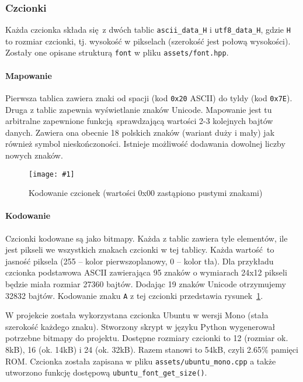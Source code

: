 \documentclass[polish]{aghengthesis}
\newcommand{\imgint}[4]{
	\begin{figure}[{#4}]
		\centering
		\texttt{[image: \#1]}
		\caption{#2}
		\label{#1}
	\end{figure}
}
\newcommand{\imgh}[3]{\imgint{#1}{#2}{#3}{H}}
\begin{document}
			\subsubsection{Czcionki}
				Każda czcionka składa się z dwóch tablic \lstinline|ascii_data_H| i \lstinline|utf8_data_H|, gdzie \lstinline|H| to rozmiar czcionki, tj. wysokość w pikselach (szerokość jest połową wysokości). Zostały one opisane strukturą \lstinline|font| w pliku \lstinline|assets/font.hpp|.
				
				\paragraph{Mapowanie}
					Pierwsza tablica zawiera znaki od spacji (kod \lstinline|0x20| ASCII) do tyldy (kod \lstinline|0x7E|). Druga z tablic zapewnia wyświetlanie znaków Unicode. Mapowanie jest tu arbitralne zapewnione funkcją sprawdzającą wartości 2-3 kolejnych bajtów danych. Zawiera ona obecnie 18 polskich znaków (wariant duży i mały) jak również symbol nieskończoności. Istnieje możliwość dodawania dowolnej liczby nowych znaków.
				
				\imgh{3/PicoRadio-screen-font}{Kodowanie czcionek (wartości 0x00 zastąpiono pustymi znakami)}{0.6}
				\paragraph{Kodowanie}
					Czcionki kodowane są jako bitmapy. Każda z tablic zawiera tyle elementów, ile jest pikseli we wszystkich znakach czcionki w tej tablicy. Każda wartość to jasność piksela (255 -- kolor pierwszoplanowy, 0 -- kolor tła). Dla przykładu czcionka podstawowa ASCII zawierająca 95 znaków o wymiarach 24x12 pikseli będzie miała rozmiar 27360 bajtów. Dodając 19 znaków Unicode otrzymujemy 32832 bajtów. Kodowanie znaku \lstinline|A| z tej czcionki przedstawia rysunek~\ref{3/PicoRadio-screen-font}.
				
				$ $\\
				W projekcie została wykorzystana czcionka Ubuntu\textsuperscript{\cite{ubuntu_font}} w wersji Mono (stała szerokość każdego znaku). Stworzony skrypt w języku Python wygenerował potrzebne bitmapy do projektu. Dostępne rozmiary czcionki to 12 (rozmiar ok. 8kB), 16 (ok. 14kB) i 24 (ok. 32kB). Razem stanowi to 54kB, czyli 2.65\% pamięci ROM. Czcionka została zapisana w pliku \lstinline|assets/ubuntu_mono.cpp| a także utworzono funkcję dostępową \lstinline|ubuntu_font_get_size()|. 
				
\end{document}
